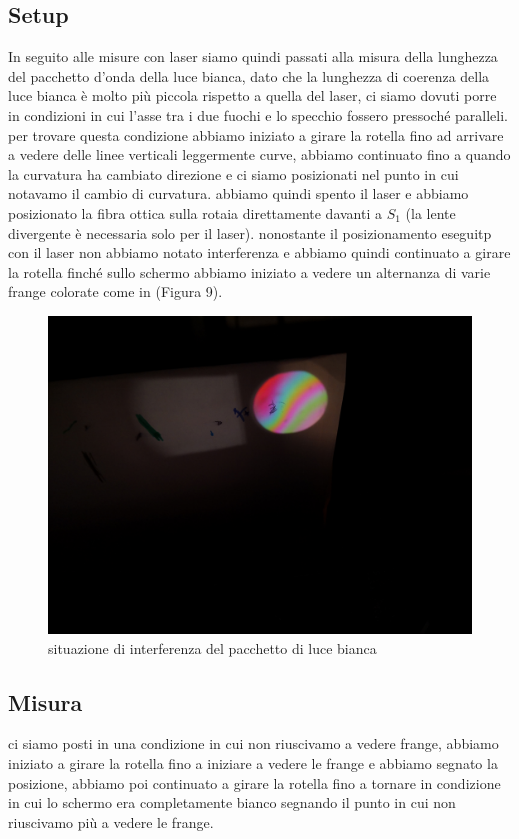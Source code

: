\documentclass{article}
\begin{document}
\subsection{Setup}
In seguito alle misure con laser siamo quindi passati alla misura della lunghezza del pacchetto d'onda della luce bianca, dato che la lunghezza di coerenza della luce bianca è molto più piccola rispetto a quella del laser, ci siamo dovuti porre in condizioni in cui l'asse tra i due fuochi e lo specchio fossero pressoché paralleli. per trovare questa condizione abbiamo iniziato a girare la rotella fino ad arrivare a vedere delle linee verticali leggermente curve, abbiamo continuato fino a quando la curvatura ha cambiato direzione e ci siamo posizionati nel punto in cui notavamo il cambio di curvatura. abbiamo quindi spento il laser e abbiamo posizionato la fibra ottica sulla rotaia direttamente davanti a $S_1$ (la lente divergente è necessaria solo per il laser). nonostante il posizionamento eseguitp con il laser non abbiamo notato interferenza e abbiamo quindi continuato a girare la rotella finché sullo schermo abbiamo iniziato a vedere un alternanza di varie frange colorate come in (Figura 9).

\begin{figure}[h!]
  \centering
  \includegraphics[width=0.6\linewidth]{IM pacchetto}
  \caption{situazione di interferenza del pacchetto di luce bianca}
\end{figure}


\subsection{Misura}
ci siamo posti in una condizione in cui non riuscivamo a vedere frange, abbiamo iniziato a girare la rotella fino a iniziare a vedere le frange e abbiamo segnato la posizione, abbiamo poi continuato a girare la rotella fino a tornare in condizione in cui lo schermo era completamente bianco segnando il punto in cui non riuscivamo più a vedere le frange.
 
\end{document}
